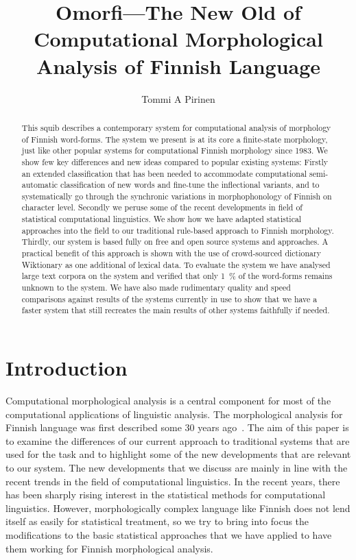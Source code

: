 \documentclass[a4paper,12pt]{article}
\title{Omorfi---The New Old of Computational Morphological Analysis of Finnish
Language}
\author{Tommi A Pirinen}
\begin{document}
\maketitle

\begin{abstract}

    This squib describes a contemporary system for computational analysis of
    morphology of Finnish word-forms. The system we present is at its core a
    finite-state morphology, just like other popular systems for computational
    Finnish morphology since 1983.  We show few key differences and new ideas
    compared to popular existing systems: Firstly an extended classification
    that has been needed to accommodate computational semi-automatic
    classification of new words and fine-tune the inflectional variants, and to
    systematically go through the synchronic variations in morphophonology of
    Finnish on character level.  Secondly we peruse some of the recent
    developments in field of statistical computational linguistics. We show how
    we have adapted statistical approaches into the field to our traditional
    rule-based approach to Finnish morphology. Thirdly, our system is based
    fully on free and open source systems and approaches. A practical benefit
    of this approach is shown with the use of crowd-sourced dictionary
    Wiktionary as one additional of lexical data.  To evaluate the system we
    have analysed large text corpora on the system and verified that only 1~\%
    of the word-forms remains unknown to the system.  We have also made
    rudimentary quality and speed comparisons against results of the systems
    currently in use to show that we have a faster system that still recreates
    the main results of other systems faithfully if needed.

\end{abstract}

\section{Introduction}

Computational morphological analysis is a central component for most of the
computational applications of linguistic analysis. The morphological analysis
for Finnish language was first described some 30 years
ago~\citep{koskenniemi1983twolevel}. The aim of this paper is to examine the
differences of our current approach to traditional systems that are used for
the task and to highlight some of the new developments that are relevant to our
system. The new developments that we discuss are mainly in line with the recent
trends in the field of computational linguistics. In the recent years, there
has been sharply rising interest in the statistical methods for computational
linguistics. However, morphologically complex language like Finnish does not
lend itself as easily for statistical treatment, so we try to bring into focus
the modifications to the basic statistical approaches that we have applied to
have them working for Finnish morphological analysis. 
\end{document}
